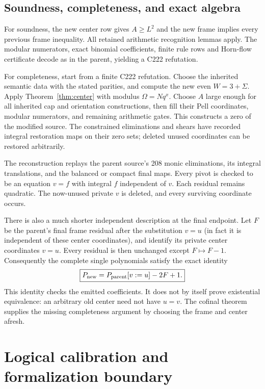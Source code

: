 \documentclass[10pt,letterpaper]{article}
\theoremstyle{definition}\newtheorem{definition}[theorem]{Definition}
\theoremstyle{remark}\newtheorem{remark}[theorem]{Remark}
\begin{document}
\subsection{Soundness, completeness, and exact algebra}

For soundness, the new center row gives $A\ge L^2$ and the new frame
implies every previous frame inequality. All retained arithmetic
recognition lemmas apply. The modular numerators, exact binomial
coefficients, finite rule rows and Horn-flow certificate decode as in
the parent, yielding a C222 refutation.

For completeness, start from a finite C222 refutation. Choose the
inherited semantic data with the stated parities, and compute the new
even $W=3+\Sigma$. Apply Theorem~\ref{thm:center} with modulus
$\Omega=Nq^x$. Choose $A$ large
enough for all inherited cap and orientation constructions, then fill
their Pell coordinates, modular numerators, and remaining arithmetic
gates. This constructs a zero of the modified source. The constrained
eliminations and shears have recorded integral restoration maps on their
zero sets; deleted unused coordinates can be restored arbitrarily.

The reconstruction replays the parent source's 208 monic eliminations,
its integral translations, and the balanced or compact final maps.
Every pivot is checked to be an equation $v=f$ with integral $f$
independent of $v$. Each residual remains quadratic. The now-unused
private $v$ is deleted, and every surviving coordinate occurs.

There is also a much shorter independent description at the final
endpoint. Let $F$ be the parent's final frame residual after the substitution
$v=u$ (in fact it is independent of these center coordinates), and identify its
private center coordinates $v=u$. Every residual is then unchanged
except $F\mapsto F-1$. Consequently the complete single polynomials
satisfy the exact identity
\begin{equation}\label{eq:globalidentity}
 \boxed{P_{\rm new}=P_{\rm parent}[v:=u]-2F+1.}
\end{equation}
This identity checks the emitted coefficients. It does not by itself
prove existential equivalence: an arbitrary old center need not have
$u=v$. The cofinal theorem supplies the missing completeness argument
by choosing the frame and center afresh.



\section{Logical calibration and formalization boundary}
\end{document}
